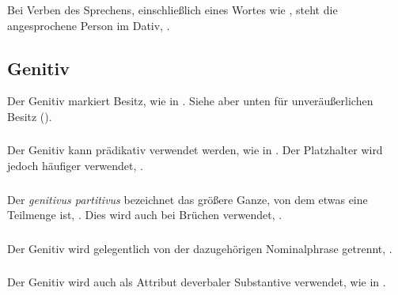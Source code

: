 \subsubsection{} Bei Verben des Sprechens, einschließlich eines Wortes wie  , steht die angesprochene Person im Dativ,  .

\subsection{Genitiv} Der Genitiv markiert Besitz, wie in  . Siehe aber unten für unveräußerlichen Besitz ().

\subsubsection{} Der Genitiv kann prädikativ verwendet werden, wie in  . Der Platzhalter   wird jedoch häufiger verwendet,  . \label{syn:pum:genitive}

\subsubsection{} Der \textit{genitivus partitivus} bezeichnet das größere Ganze, von dem etwas eine Teilmenge ist,  . Dies wird auch bei Brüchen verwendet,  . 
\label{syn:partitive-gen}

\subsubsection{} Der Genitiv wird gelegentlich von der dazugehörigen Nominalphrase getrennt,  .

\subsubsection{} Der Genitiv wird auch als Attribut deverbaler Substantive verwendet, wie in  .

